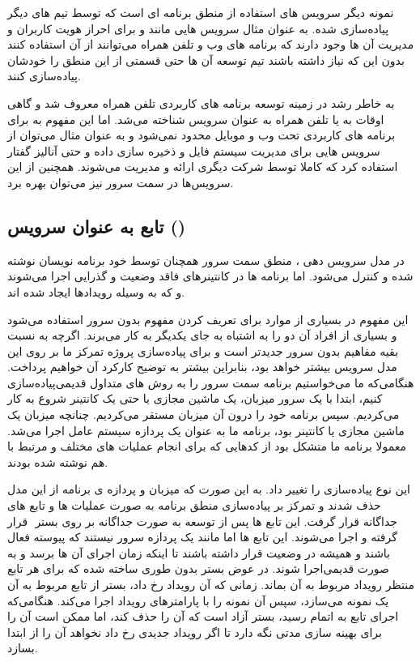 نمونه دیگر سرویس های  استفاده از منطق برنامه ای است که توسط تیم های دیگر پیاده‌سازی شده. به عنوان مثال سرویس هایی مانند  و  برای احراز هویت کاربران و مدیریت آن ها وجود دارند که برنامه های وب و تلفن همراه می‌توانند از آن استفاده کنند بدون این که نیاز داشته باشند تیم توسعه آن ها حتی قسمتی از این منطق را خودشان پیاده‌سازی کنند.

 به خاطر رشد در زمینه  توسعه برنامه های کاربردی تلفن همراه معروف شد و گاهی اوقات به  یا  تلفن همراه به عنوان سرویس شناخته می‌شد. اما این مفهوم به  برای برنامه های کاربردی تحت وب و موبایل محدود نمی‌شود و به عنوان مثال می‌توان از سرویس هایی برای مدیریت سیستم فایل و ذخیره سازی داده و حتی آنالیز گفتار استفاده کرد که کاملا توسط شرکت دیگری ارائه و مدیریت می‌شوند. همچنین از این سرویس‌ها در سمت سرور نیز می‌توان بهره برد.

\subsection{تابع به عنوان سرویس ()}

در مدل سرویس دهی ، منطق سمت سرور همچنان توسط خود برنامه نویسان نوشته شده و کنترل می‌شود. اما برنامه ها در کانتینرهای فاقد وضعیت و گذرایی اجرا می‌شوند و که به وسیله رویدادها ایجاد شده اند.

این مفهوم در بسیاری از موارد برای تعریف کردن مفهوم بدون سرور استفاده می‌شود و بسیاری از افراد آن دو را به اشتباه به جای یکدیگر به کار می‌برند. اگرچه  به نسبت بقیه مفاهیم بدون سرور جدیدتر است و برای پیاده‌سازی پروژه تمرکز ما بر روی این مدل سرویس بیشتر خواهد بود، بنابراین بیشتر به توضیح کارکرد آن خواهیم پرداخت.
هنگامی‌که ما می‌خواستیم برنامه سمت سرور را به روش های متداول قدیمی‌پیاده‌سازی کنیم، ابتدا با یک سرور میزبان، یک ماشین مجازی یا حتی یک کانتینر شروع به کار می‌کردیم. سپس برنامه خود را درون آن میزبان مستقر می‌کردیم. چنانچه میزبان یک ماشین مجازی یا کانتینر بود، برنامه ما به عنوان یک پردازه سیستم عامل اجرا می‌شد. معمولا برنامه ما متشکل بود از کدهایی که برای انجام عملیات های مختلف و مرتبط با هم نوشته شده بودند.

 این نوع پیاده‌سازی را تغییر داد. به این صورت که میزبان و پردازه ی برنامه از این مدل حذف شدند و تمرکز بر پیاده‌سازی منطق برنامه به صورت عملیات ها و تابع های جداگانه قرار گرفت. این تابع ها پس از توسعه به صورت جداگانه بر روی بستر ‌ قرار گرفته و اجرا می‌شوند. این تابع ها اما مانند یک پردازه سرور نیستند که  پیوسته فعال باشند و همیشه در وضعیت  قرار داشته باشند تا اینکه زمان اجرای آن ها برسد و به صورت قدیمی‌اجرا شوند. در عوض بستر بدون  طوری ساخته شده که برای هر تابع منتظر رویداد مربوط به آن بماند. زمانی که آن رویداد رخ داد، بستر از تابع مربوط به آن یک نمونه می‌سازد، سپس آن نمونه را با پارامترهای رویداد اجرا می‌کند. هنگامی‌که اجرای تابع به اتمام رسید، بستر  آزاد است که آن را حذف کند، اما ممکن است آن را برای بهینه سازی مدتی نگه دارد تا اگر رویداد جدیدی رخ داد نخواهد آن را از ابتدا بسازد.

